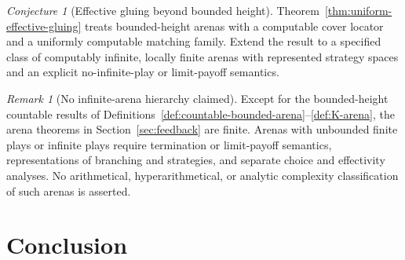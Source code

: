 \documentclass[11pt]{article}
\theoremstyle{plain}
\theoremstyle{definition}
\theoremstyle{remark}
\newtheorem{remark}[theorem]{Remark}
\newtheorem{conjecture}[theorem]{Conjecture}
\begin{document}
\begin{conjecture}[Effective gluing beyond bounded height]
\label{conj:effective-gluing}
Theorem~\ref{thm:uniform-effective-gluing} treats bounded-height arenas with a
computable cover locator and a uniformly computable matching family. Extend the
result to a specified class of computably infinite, locally finite arenas with
represented strategy spaces and an explicit no-infinite-play or limit-payoff
semantics.
\end{conjecture}

\begin{remark}[No infinite-arena hierarchy claimed]
Except for the bounded-height countable results of
Definitions~\ref{def:countable-bounded-arena}--\ref{def:K-arena}, the arena
theorems in Section~\ref{sec:feedback} are finite. Arenas with unbounded finite
plays or infinite plays require termination or limit-payoff semantics,
representations of branching and strategies, and separate choice and
effectivity analyses. No arithmetical, hyperarithmetical, or analytic complexity
classification of such arenas is asserted.
\end{remark}







\section{Conclusion}\label{sec:conclusion}
\end{document}
